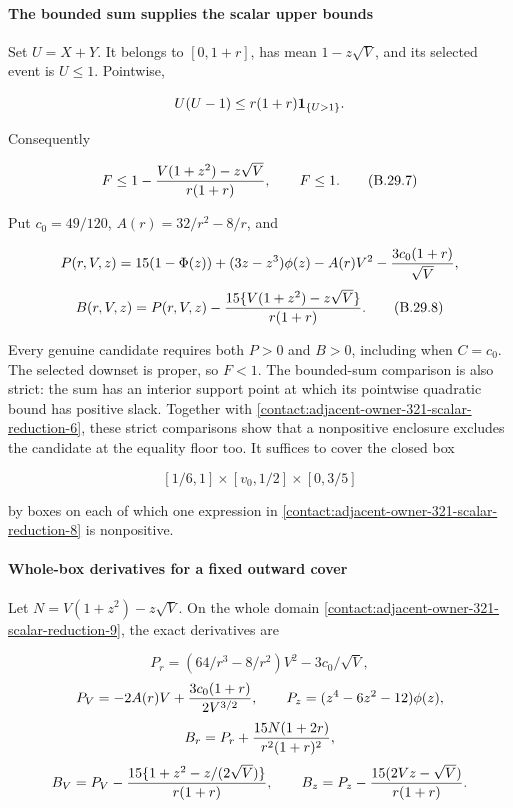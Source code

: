 \paragraph{The bounded sum supplies the scalar upper bounds}

Set $U=X+Y$. It belongs to $[0,1+r]$, has mean $1-z\sqrt V$, and its
selected event is $U\le 1$. Pointwise,

\[
 U(U-1)\le r(1+r)\mathbf 1_{\{U>1\}}.
\]

Consequently

\[
 F\le1-{V(1+z^2)-z\sqrt V\over r(1+r)},\qquad F\le1.
\tag{B.29.7}\label{contact:adjacent-owner-321-scalar-reduction-7}
\]

Put $c_0=49/120$, $A(r)=32/r^2-8/r$, and

\[
 P(r,V,z)=15(1-\Phi(z))+(3z-z^3)\phi(z)
 -A(r)V^2-{3c_0(1+r)\over\sqrt V},
\]
\[
 B(r,V,z)=P(r,V,z)
 -{15\{V(1+z^2)-z\sqrt V\}\over r(1+r)}.
\tag{B.29.8}\label{contact:adjacent-owner-321-scalar-reduction-8}
\]

Every genuine candidate requires both $P>0$ and $B>0$, including when
$C=c_0$. The selected downset is proper, so $F<1$. The bounded-sum
comparison is also strict: the sum has an interior support point at
which its pointwise quadratic bound has positive slack. Together with
\eqref{contact:adjacent-owner-321-scalar-reduction-6}, these strict
comparisons show that a nonpositive enclosure excludes the candidate
at the equality floor too. It suffices to cover the closed box

\[
 [1/6,1]\times[v_0,1/2]\times[0,3/5]
\tag{B.29.9}\label{contact:adjacent-owner-321-scalar-reduction-9}
\]

by boxes on each of which one expression in
\eqref{contact:adjacent-owner-321-scalar-reduction-8} is nonpositive.

\paragraph{Whole-box derivatives for a fixed outward cover}

Let $N=V(1+z^2)-z\sqrt V$. On the whole domain
\eqref{contact:adjacent-owner-321-scalar-reduction-9}, the exact derivatives are

\[
 P_r=(64/r^3-8/r^2)V^2-3c_0/\sqrt V,
\]
\[
 P_V=-2A(r)V+{3c_0(1+r)\over2V^{3/2}},\qquad
 P_z=(z^4-6z^2-12)\phi(z),
\]
\[
 B_r=P_r+{15N(1+2r)\over r^2(1+r)^2},
\]
\[
 B_V=P_V-{15\{1+z^2-z/(2\sqrt V)\}\over r(1+r)},\qquad
 B_z=P_z-{15(2Vz-\sqrt V)\over r(1+r)}.
\]

